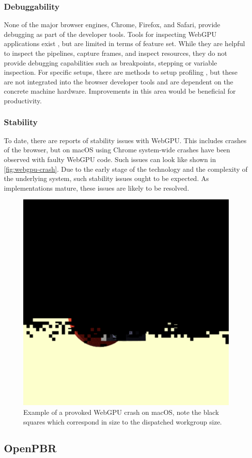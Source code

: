 \subsubsection*{Debuggability}

None of the major browser engines, Chrome, Firefox, and Safari, provide debugging as part of the developer tools. Tools for inspecting \gls{WebGPU} applications exist \cite{webGpuDevToolsDuncan, webGpuDevToolsTakahiro}, but are limited in terms of feature set. While they are helpful to inspect the pipelines, capture frames, and inspect resources, they do not provide debugging capabilities such as breakpoints, stepping or variable inspection. For specific setups, there are methods to setup profiling \cite{webGpuProfilingWithPix}, but these are not integrated into the browser developer tools and are dependent on the concrete machine hardware. Improvements in this area would be beneficial for productivity.

\subsubsection*{Stability}

To date, there are reports of stability issues with \gls{WebGPU}. This includes crashes of the browser, but on macOS using Chrome system-wide crashes have been observed with faulty \gls{WebGPU} code. Such issues can look like shown in \autoref{fig:webgpu-crash}. Due to the early stage of the technology and the complexity of the underlying system, such stability issues ought to be expected. As implementations mature, these issues are likely to be resolved.

\begin{figure}[H]
  \centering
  \includegraphics[width=0.25\columnwidth]{resources/webgpu-crashes.png}
  \caption{Example of a provoked WebGPU crash on macOS, note the black squares which correspond in size to the dispatched workgroup size.}
  \label{fig:webgpu-crash}
\end{figure}

\subsection*{OpenPBR}


